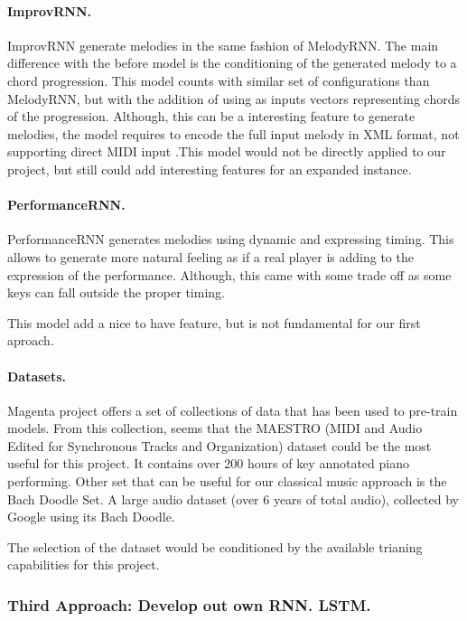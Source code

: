\paragraph{ImprovRNN.}
ImprovRNN generate melodies in the same fashion of MelodyRNN. The main difference with the
before model is the conditioning of the generated melody to a chord progression. This
model counts with similar set of configurations than MelodyRNN, but with the addition of
using as inputs vectors representing chords of the progression. Although, this can be a
interesting feature to generate melodies, the model requires to encode the full input
melody in XML format, not supporting direct MIDI input \autocite{improvRNN}.This model
would not be directly applied to our project, but still could add interesting features for
an expanded instance.

\paragraph{PerformanceRNN.}
PerformanceRNN generates melodies using dynamic and expressing timing. This allows to
generate more natural feeling as if a real player is adding to the expression of the
performance. Although, this came with some trade off as some keys can fall outside the
proper timing. \autocite{performanceRNN}

This model add a nice to have feature, but is not fundamental for our first aproach.

\paragraph{Datasets.}
Magenta project offers a set of collections of data that has been used to pre-train
models. From this collection, seems that the MAESTRO (MIDI and Audio Edited for Synchronous
Tracks and Organization) dataset could be the most useful for this project. It contains
over 200 hours of key annotated piano performing. Other set that can be useful for our
classical music approach is the Bach Doodle Set. A large audio dataset (over 6 years of
total audio), collected by Google using its Bach Doodle. \autocite{magentaData}

The selection of the dataset would be conditioned by the available trianing capabilities
for this project.

\subsubsection{Third Approach: Develop out own RNN. LSTM.}

